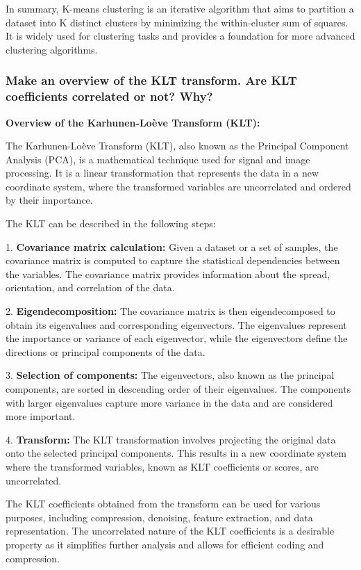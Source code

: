 \documentclass{article}
\begin{document}
In summary, K-means clustering is an iterative algorithm that aims to partition a dataset into K distinct clusters by minimizing the within-cluster sum of squares. It is widely used for clustering tasks and provides a foundation for more advanced clustering algorithms.

\subsubsection{Make an overview of the KLT transform. Are KLT coefficients correlated or not? Why?}
\textbf{Overview of the Karhunen-Loève Transform (KLT):}

The Karhunen-Loève Transform (KLT), also known as the Principal Component Analysis (PCA), is a mathematical technique used for signal and image processing. It is a linear transformation that represents the data in a new coordinate system, where the transformed variables are uncorrelated and ordered by their importance.

The KLT can be described in the following steps:

1. \textbf{Covariance matrix calculation:} Given a dataset or a set of samples, the covariance matrix is computed to capture the statistical dependencies between the variables. The covariance matrix provides information about the spread, orientation, and correlation of the data.

2. \textbf{Eigendecomposition:} The covariance matrix is then eigendecomposed to obtain its eigenvalues and corresponding eigenvectors. The eigenvalues represent the importance or variance of each eigenvector, while the eigenvectors define the directions or principal components of the data.

3. \textbf{Selection of components:} The eigenvectors, also known as the principal components, are sorted in descending order of their eigenvalues. The components with larger eigenvalues capture more variance in the data and are considered more important.

4. \textbf{Transform:} The KLT transformation involves projecting the original data onto the selected principal components. This results in a new coordinate system where the transformed variables, known as KLT coefficients or scores, are uncorrelated.

The KLT coefficients obtained from the transform can be used for various purposes, including compression, denoising, feature extraction, and data representation. The uncorrelated nature of the KLT coefficients is a desirable property as it simplifies further analysis and allows for efficient coding and compression.
\end{document}
